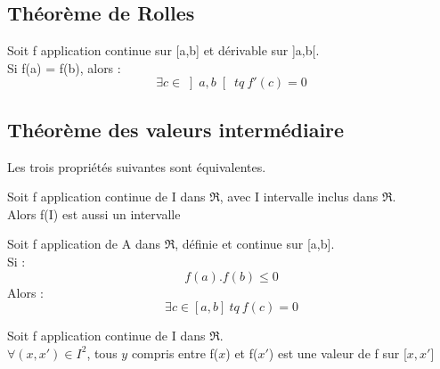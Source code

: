 \subsection{Théorème de Rolles}
\begin{enon}
Soit f application continue sur [a,b] et dérivable sur ]a,b[.\\
Si f(a) = f(b), alors : 
$$\exists c \in \left]a,b\right[~ tq~ f'(c) = 0 $$
\end{enon}
\subsection{Théorème des valeurs intermédiaire}
Les trois propriétés suivantes sont équivalentes.
\begin{prop}
Soit f application continue de I dans $\Re$, avec I intervalle inclus dans $\Re$.\\
Alors f(I) est aussi un intervalle
\end{prop}
\begin{prop}
Soit f application de A dans $\Re$, définie et continue sur [a,b].\\
Si :
$$f(a).f(b)\leq 0$$
Alors :
$$\exists c \in \left[a,b\right]~ tq~ f(c)=0$$
\end{prop}
\begin{prop}
Soit f application continue de I dans $\Re$.\\
$\forall (x,x') \in I^2$, tous $y$ compris entre f($x$) et f($x'$) est une valeur de f sur [$x,x'$]
\end{prop}
